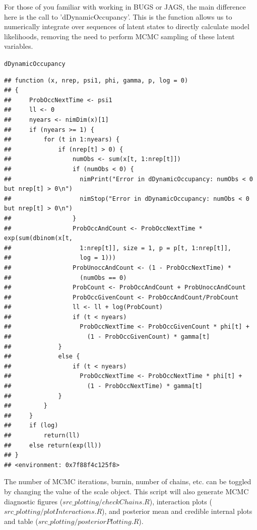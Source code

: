 \documentclass{article}\usepackage[]{graphicx}\usepackage[]{color}
\makeatletter
\newcommand{\hlstd}[1]{\textcolor[rgb]{0.345,0.345,0.345}{#1}}%
\newenvironment{kframe}{%
 \def\at@end@of@kframe{}%
 \ifinner\ifhmode%
  \def\at@end@of@kframe{\end{minipage}}%
  \begin{minipage}{\columnwidth}%
 \fi\fi%
 \def\FrameCommand##1{\hskip\@totalleftmargin \hskip-\fboxsep
 \colorbox{shadecolor}{##1}\hskip-\fboxsep
     \hskip-\linewidth \hskip-\@totalleftmargin \hskip\columnwidth}%
 \MakeFramed {\advance\hsize-\width
   \@totalleftmargin\z@ \linewidth\hsize
   \@setminipage}}%
 {\par\unskip\endMakeFramed%
 \at@end@of@kframe}
\newenvironment{knitrout}{}{} %
\makeatother
\begin{document}
For those of you familiar with working in BUGS or JAGS, the main
difference here is the call to 'dDynamicOccupancy'. This is the
function allows us to numerically integrate over sequences of latent
states to directly calculate model likelihoods, removing the need to
perform MCMC sampling of these latent variables.



\begin{knitrout}
\color{fgcolor}\begin{kframe}
\begin{alltt}
\hlstd{dDynamicOccupancy}
\end{alltt}
\begin{verbatim}
## function (x, nrep, psi1, phi, gamma, p, log = 0) 
## {
##     ProbOccNextTime <- psi1
##     ll <- 0
##     nyears <- nimDim(x)[1]
##     if (nyears >= 1) {
##         for (t in 1:nyears) {
##             if (nrep[t] > 0) {
##                 numObs <- sum(x[t, 1:nrep[t]])
##                 if (numObs < 0) {
##                   nimPrint("Error in dDynamicOccupancy: numObs < 0 but nrep[t] > 0\n")
##                   nimStop("Error in dDynamicOccupancy: numObs < 0 but nrep[t] > 0\n")
##                 }
##                 ProbOccAndCount <- ProbOccNextTime * exp(sum(dbinom(x[t, 
##                   1:nrep[t]], size = 1, p = p[t, 1:nrep[t]], 
##                   log = 1)))
##                 ProbUnoccAndCount <- (1 - ProbOccNextTime) * 
##                   (numObs == 0)
##                 ProbCount <- ProbOccAndCount + ProbUnoccAndCount
##                 ProbOccGivenCount <- ProbOccAndCount/ProbCount
##                 ll <- ll + log(ProbCount)
##                 if (t < nyears) 
##                   ProbOccNextTime <- ProbOccGivenCount * phi[t] + 
##                     (1 - ProbOccGivenCount) * gamma[t]
##             }
##             else {
##                 if (t < nyears) 
##                   ProbOccNextTime <- ProbOccNextTime * phi[t] + 
##                     (1 - ProbOccNextTime) * gamma[t]
##             }
##         }
##     }
##     if (log) 
##         return(ll)
##     else return(exp(ll))
## }
## <environment: 0x7f88f4c125f8>
\end{verbatim}
\end{kframe}
\end{knitrout}

The number of MCMC iterations, burnin, number of chains, etc. can be
toggled by changing the value of the scale object. This script will
also generate MCMC diagnostic figures ($src\_plotting/checkChains.R$),
interaction plots ($src\_plotting/plotInteractions.R$), and posterior
mean and credible internal plots and table ($src\_plotting/posteriorPlotting.R$).
\end{document}
